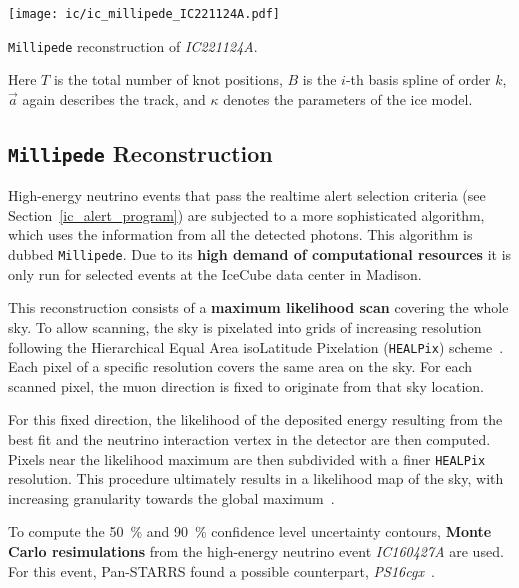 \begin{marginfigure}
    \texttt{[image: ic/ic\_millipede\_IC221124A.pdf]}
    \caption[\texttt{Millipede} reconstruction of \emph{IC221124A}]{\texttt{Millipede} reconstruction of \emph{IC221124A}.}
\end{marginfigure}

Here $T$ is the total number of knot positions, $B$ is the $i$-th basis spline of order $k$, $\vec{a}$ again describes the track, and $\kappa$ denotes the parameters of the ice model.

\subsection{\texttt{Millipede} Reconstruction}\label{millipede}

High-energy neutrino events that pass the realtime alert selection criteria (see Section~\ref{ic_alert_program}) are subjected to a more sophisticated algorithm, which uses the information from all the detected photons. This algorithm is dubbed \texttt{Millipede}. Due to its \textbf{high demand of computational resources} it is only run for selected events at the IceCube data center in Madison.

This reconstruction consists of a \textbf{maximum likelihood scan} covering the whole sky. To allow scanning, the sky is pixelated into grids of increasing resolution following the Hierarchical Equal Area isoLatitude Pixelation (\texttt{HEALPix}) scheme~. Each pixel of a specific resolution covers the same area on the sky. For each scanned pixel, the muon direction is fixed to originate from that sky location.

For this fixed direction, the likelihood of the deposited energy resulting from the best fit and the neutrino interaction vertex in the detector are then computed. Pixels near the likelihood maximum are then subdivided with a finer \texttt{HEALPix} resolution. This procedure ultimately results in a likelihood map of the sky, with increasing granularity towards the global maximum~.

To compute the \SI{50}{\percent} and \SI{90}{\percent} confidence level uncertainty contours, \textbf{Monte Carlo resimulations} from the high-energy neutrino event \emph{IC160427A} are used. For this event, Pan-STARRS found a possible counterpart, \emph{PS16cgx}~.

